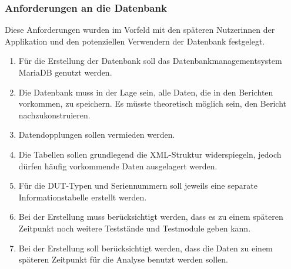 \subsubsection{Anforderungen an die Datenbank}

Diese Anforderungen wurden im Vorfeld mit den späteren Nutzerinnen der Applikation und den potenziellen Verwendern der Datenbank festgelegt.

\begin{enumerate}
\item Für die Erstellung der Datenbank soll das Datenbankmanagementsystem MariaDB genutzt werden.


\item Die Datenbank muss in der Lage sein, alle Daten, die in den Berichten vorkommen, zu speichern. Es müsste theoretisch möglich sein, den Bericht nachzukonstruieren.


\item Datendopplungen sollen vermieden werden.


\item Die Tabellen sollen grundlegend die \ac{XML}-Struktur widerspiegeln, jedoch dürfen häufig vorkommende Daten ausgelagert werden.


\item Für die DUT-Typen und Seriennummern soll jeweils eine separate Informationstabelle erstellt werden.


\item Bei der Erstellung muss berücksichtigt werden, dass es zu einem späteren Zeitpunkt noch weitere Teststände und Testmodule geben kann.


\item Bei der Erstellung soll berücksichtigt werden, dass die Daten zu einem späteren Zeitpunkt für die Analyse benutzt werden sollen.


\end{enumerate}

